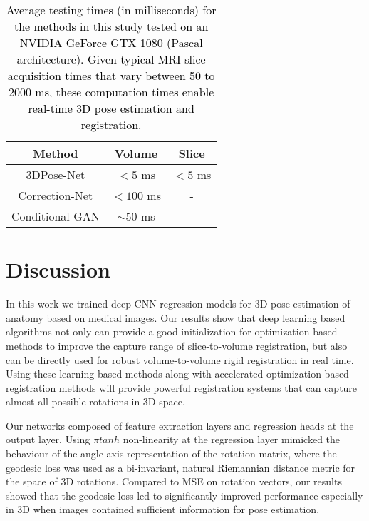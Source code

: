 \documentclass[journal,transmag]{IEEEtran}
\begin{document}
\begin{table}[h!]
\small
\centering
 \begin{tabular}{|c||c|c|} 
 \hline
Method & Volume & Slice \\
 \hline
3DPose-Net & $<5$ ms & $<5$ ms \\
 \hline
Correction-Net & $<100$ ms & - \\ 
 \hline
Conditional GAN & $\sim50$ ms & - \\
 \hline
\end{tabular}
\caption{\textcolor{black}{Average testing times (in milliseconds) for the methods in this study tested on an NVIDIA GeForce GTX 1080 (Pascal architecture). Given typical MRI slice acquisition times that vary between 50 to 2000 ms, these computation times enable real-time 3D pose estimation and registration.}}
\label{table:Time}
\end{table}

\section{Discussion}
\label{sec:discussion}
In this work we trained deep CNN regression models for 3D pose estimation of anatomy based on medical images. Our results show that deep learning based algorithms not only can provide a good initialization for optimization-based methods to improve the capture range of slice-to-volume registration, but also can be directly used for robust volume-to-volume rigid registration in real time. Using these learning-based methods along with accelerated optimization-based registration methods will provide powerful registration systems that can capture almost all possible rotations in 3D space.

Our networks composed of feature extraction layers and regression heads at the output layer. Using $\pi tanh$ non-linearity at the regression layer mimicked the behaviour of the angle-axis representation of the rotation matrix, where the geodesic loss was used as a bi-invariant, natural \textcolor{black}{Riemannian} distance metric for the space of 3D rotations. Compared to MSE on rotation vectors, our results showed that the geodesic loss led to significantly improved performance especially in 3D when images contained sufficient information for pose estimation.%
\end{document}
